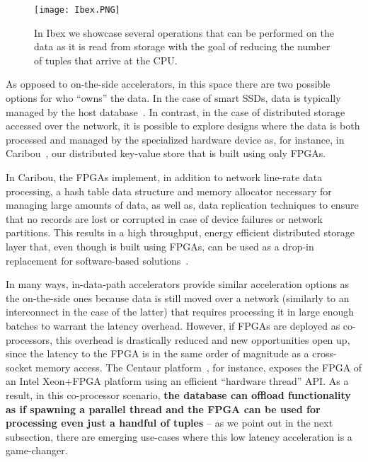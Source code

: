 \documentclass[11pt]{article}
\begin{document}
\begin{figure}[h]
\centering
\texttt{[image: Ibex.PNG]}
\vspace{-1em}
\caption{In Ibex we showcase several operations that can be performed on the data as it is read from storage with the goal of reducing the number of tuples that arrive at the CPU.\label{fig:Ibex}}
\end{figure}

As opposed to on-the-side accelerators, in this space there are two possible options for who ``owns'' the data. In the case of smart SSDs, data is typically managed by the host database~\cite{jo-yoursql-vldb16}\cite{woods-Ibex-vldb14}. In contrast, in the case of distributed storage accessed over the network, it is possible to explore designs where the data is both processed and managed by the specialized hardware device as, for instance, in Caribou~\cite{istvan-caribou-vldb17}\cite{zistvan-diss-2018}, our distributed key-value store that is built using only FPGAs. 

In Caribou, the FPGAs implement, in addition to network line-rate data processing, a hash table data structure and memory allocator necessary for managing large amounts of data, as well as, data replication techniques to ensure that no records are lost or corrupted in case of device failures or network partitions. This results in a high throughput, energy efficient distributed storage layer that, even though is built using FPGAs, can be used as a drop-in replacement for software-based solutions~\cite{zistvan-diss-2018}.



In many ways, in-data-path accelerators provide similar acceleration options as the on-the-side ones because data is still moved over a network (similarly to an interconnect in the case of the latter) that requires processing it in large enough batches to warrant the latency overhead. However, if FPGAs are deployed as co-processors, this overhead is drastically reduced and new opportunities open up, since the latency to the FPGA is in the same order of magnitude as a cross-socket memory access. The Centaur platform~\cite{owaida-centaur-fccm17}, for instance, exposes the FPGA of an Intel Xeon+FPGA platform using an efficient ``hardware thread'' API. As a result, in this co-processor scenario, \textbf{the database can offload functionality as if spawning a parallel thread and the FPGA can be used for processing even just a handful of tuples} -- as we point out in the next subsection, there are emerging use-cases where this low latency acceleration is a game-changer. 
\end{document}
